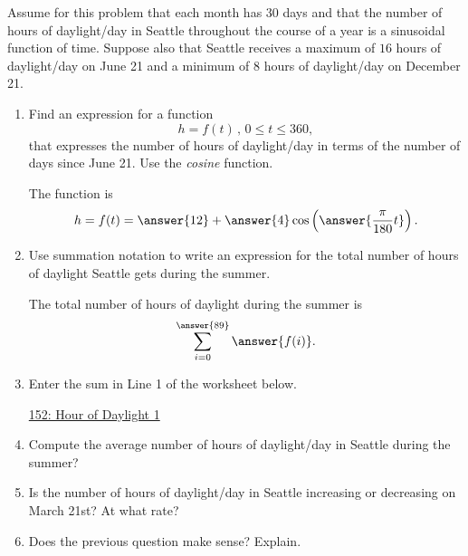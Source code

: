 \documentclass{ximera}
\begin{document}
\begin{exercise} \label{EXIIU4349se9}
Assume for this problem that each month has 30 days and that the number of hours of daylight/day in Seattle throughout the course of a year is a sinusoidal function of time. Suppose also that Seattle receives a maximum of $16$ hours of daylight/day on June 21 and a minimum of $8$ hours of daylight/day on December 21.

\begin{enumerate}
\item Find an expression for a function
\[
        h = f(t) \, , \, 0\leq t \leq 360 ,
\]
that expresses the number of hours of daylight/day in terms of the number of days since June 21. Use the \emph{cosine} function.

The function is
\[
    h = f(t) = \answer{12} + \answer{4}\cos \left(  \answer{\frac{\pi}{180}t} \right) .
\]

\item Use summation notation to write an expression for the total number of hours of daylight Seattle gets during the summer. 

The total number of hours of daylight during the summer is
\[
    \sum_{i=0}^{\answer{89}} \answer{f(i)} .
\]

\item Enter the sum in Line 1 of the worksheet below.

\begin{onlineOnly}
    \begin{center}
\end{center}
\end{onlineOnly}

\href{https://www.desmos.com/calculator/jvwyqn0vbj}{152: Hour of Daylight 1}

\item Compute the average number of hours of daylight/day in Seattle during the summer?

\item Is the number of hours of daylight/day in Seattle increasing or decreasing on March 21st? At what rate?

\item Does the previous question make sense? Explain.


\end{enumerate}


\end{exercise}
\end{document}
